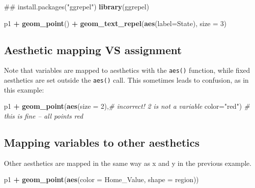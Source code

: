 \documentclass[]{book}
\newenvironment{Shaded}{\begin{snugshade}}{\end{snugshade}}
\newcommand{\KeywordTok}[1]{\textcolor[rgb]{0.13,0.29,0.53}{\textbf{#1}}}
\newcommand{\DataTypeTok}[1]{\textcolor[rgb]{0.13,0.29,0.53}{#1}}
\newcommand{\DecValTok}[1]{\textcolor[rgb]{0.00,0.00,0.81}{#1}}
\newcommand{\StringTok}[1]{\textcolor[rgb]{0.31,0.60,0.02}{#1}}
\newcommand{\CommentTok}[1]{\textcolor[rgb]{0.56,0.35,0.01}{\textit{#1}}}
\newcommand{\OperatorTok}[1]{\textcolor[rgb]{0.81,0.36,0.00}{\textbf{#1}}}
\newcommand{\NormalTok}[1]{#1}
\begin{document}
\begin{Shaded}
\begin{Highlighting}[]
\NormalTok{## install.packages("ggrepel") }
\KeywordTok{library}\NormalTok{(ggrepel)}

\NormalTok{p1 }\OperatorTok{+}\StringTok{ }
\StringTok{  }\KeywordTok{geom_point}\NormalTok{() }\OperatorTok{+}\StringTok{ }
\StringTok{  }\KeywordTok{geom_text_repel}\NormalTok{(}\KeywordTok{aes}\NormalTok{(}\DataTypeTok{label=}\NormalTok{State), }\DataTypeTok{size =} \DecValTok{3}\NormalTok{)}
\end{Highlighting}
\end{Shaded}

\subsection{Aesthetic mapping VS
assignment}\label{aesthetic-mapping-vs-assignment}

Note that variables are mapped to aesthetics with the \texttt{aes()}
function, while fixed aesthetics are set outside the \texttt{aes()}
call. This sometimes leads to confusion, as in this example:

\begin{Shaded}
\begin{Highlighting}[]
\NormalTok{p1 }\OperatorTok{+}
\StringTok{  }\KeywordTok{geom_point}\NormalTok{(}\KeywordTok{aes}\NormalTok{(}\DataTypeTok{size =} \DecValTok{2}\NormalTok{),}\CommentTok{# incorrect! 2 is not a variable}
             \DataTypeTok{color=}\StringTok{"red"}\NormalTok{) }\CommentTok{# this is fine -- all points red}
\end{Highlighting}
\end{Shaded}

\subsection{Mapping variables to other
aesthetics}\label{mapping-variables-to-other-aesthetics}

Other aesthetics are mapped in the same way as x and y in the previous
example.

\begin{Shaded}
\begin{Highlighting}[]
\NormalTok{p1 }\OperatorTok{+}
\StringTok{  }\KeywordTok{geom_point}\NormalTok{(}\KeywordTok{aes}\NormalTok{(}\DataTypeTok{color =}\NormalTok{ Home_Value, }\DataTypeTok{shape =}\NormalTok{ region))}
\end{Highlighting}
\end{Shaded}
\end{document}
